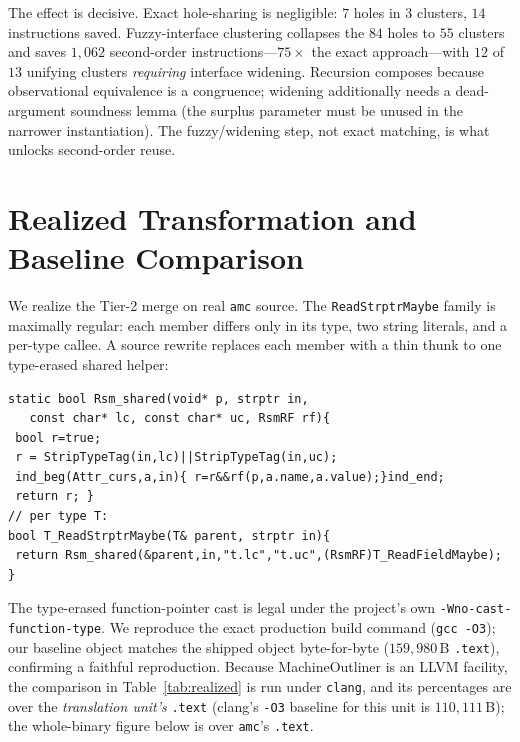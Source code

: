 \documentclass[conference]{IEEEtran}
\newcommand{\amc}{\texttt{amc}}
\begin{document}
The effect is decisive. Exact hole-sharing is negligible: $7$ holes in $3$
clusters, $14$ instructions saved. Fuzzy-interface clustering collapses the
$84$ holes to $55$ clusters and saves $1{,}062$ second-order
instructions---$75\times$ the exact approach---with $12$ of $13$ unifying
clusters \emph{requiring} interface widening. Recursion composes because
observational equivalence is a congruence; widening additionally needs a
dead-argument soundness lemma (the surplus parameter must be unused in the
narrower instantiation). The fuzzy/widening step, not exact matching, is what
unlocks second-order reuse.

\section{Realized Transformation and Baseline Comparison}
\label{sec:realized}
We realize the Tier-2 merge on real \amc{} source. The
\texttt{ReadStrptrMaybe} family is maximally regular: each member differs only
in its type, two string literals, and a per-type callee. A source rewrite
replaces each member with a thin thunk to one type-erased shared helper:

\begin{lstlisting}
static bool Rsm_shared(void* p, strptr in,
   const char* lc, const char* uc, RsmRF rf){
 bool r=true;
 r = StripTypeTag(in,lc)||StripTypeTag(in,uc);
 ind_beg(Attr_curs,a,in){ r=r&&rf(p,a.name,a.value);}ind_end;
 return r; }
// per type T:
bool T_ReadStrptrMaybe(T& parent, strptr in){
 return Rsm_shared(&parent,in,"t.lc","t.uc",(RsmRF)T_ReadFieldMaybe); }
\end{lstlisting}

\noindent The type-erased function-pointer cast is legal under the project's
own \texttt{-Wno-cast-function-type}. We reproduce the exact production build
command (\texttt{gcc -O3}); our baseline object matches the shipped object
byte-for-byte ($159{,}980$\,B \texttt{.text}), confirming a faithful
reproduction. Because MachineOutliner is an LLVM facility, the comparison in
Table~\ref{tab:realized} is run under \texttt{clang}, and its percentages are
over the \emph{translation unit's} \texttt{.text} (clang's \texttt{-O3}
baseline for this unit is $110{,}111$\,B); the whole-binary figure below is
over \amc{}'s \texttt{.text}.
\end{document}
